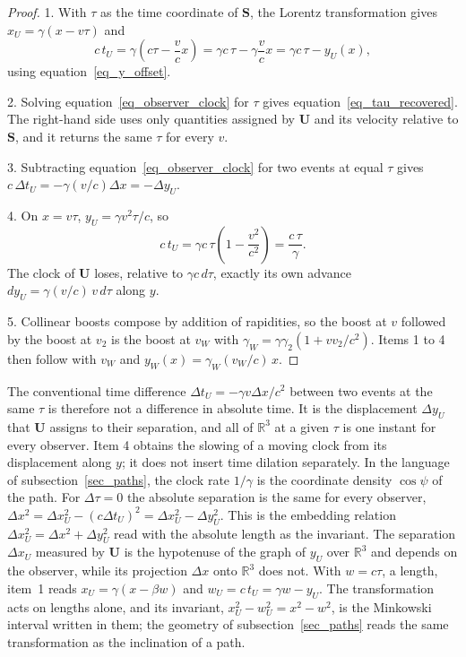 \documentclass[anonymous]{iopjournal}
\begin{document}
\begin{proof}
1. With $\tau$ as the time coordinate of $\mathbf{S}$, the Lorentz transformation gives $x_U=\gamma(x-v\tau)$ and
\begin{equation}
    c\,t_U=\gamma\left(c\tau-\frac{v}{c}x\right)=\gamma c\,\tau-\gamma\frac{v}{c}x=\gamma c\,\tau-y_U(x),
\end{equation}
using equation~\eqref{eq_y_offset}.

2. Solving equation~\eqref{eq_observer_clock} for $\tau$ gives equation~\eqref{eq_tau_recovered}. The right-hand side uses only quantities assigned by $\mathbf{U}$ and its velocity relative to $\mathbf{S}$, and it returns the same $\tau$ for every $v$.

3. Subtracting equation~\eqref{eq_observer_clock} for two events at equal $\tau$ gives $c\,\Delta t_U=-\gamma(v/c)\Delta x=-\Delta y_U$.

4. On $x=v\tau$, $y_U=\gamma v^2\tau/c$, so
\begin{equation}
    c\,t_U=\gamma c\,\tau\left(1-\frac{v^2}{c^2}\right)=\frac{c\,\tau}{\gamma}.
\end{equation}
The clock of $\mathbf{U}$ loses, relative to $\gamma c\,d\tau$, exactly its own advance $dy_U=\gamma(v/c)\,v\,d\tau$ along $y$.

5. Collinear boosts compose by addition of rapidities, so the boost at $v$ followed by the boost at $v_2$ is the boost at $v_W$ with $\gamma_W=\gamma\gamma_2(1+vv_2/c^2)$. Items 1 to 4 then follow with $v_W$ and $y_W(x)=\gamma_W(v_W/c)\,x$.
\end{proof}

The conventional time difference $\Delta t_U=-\gamma v\Delta x/c^2$ between two events at the same $\tau$ is therefore not a difference in absolute time. It is the displacement $\Delta y_U$ that $\mathbf{U}$ assigns to their separation, and all of $\mathbb{R}^3$ at a given $\tau$ is one instant for every observer. Item 4 obtains the slowing of a moving clock from its displacement along $y$; it does not insert time dilation separately. In the language of subsection~\ref{sec_paths}, the clock rate $1/\gamma$ is the coordinate density $\cos\psi$ of the path. For $\Delta\tau=0$ the absolute separation is the same for every observer, $\Delta x^2=\Delta x_U^2-(c\Delta t_U)^2=\Delta x_U^2-\Delta y_U^2$. This is the embedding relation $\Delta x_U^2=\Delta x^2+\Delta y_U^2$ read with the absolute length as the invariant. The separation $\Delta x_U$ measured by $\mathbf{U}$ is the hypotenuse of the graph of $y_U$ over $\mathbb{R}^3$ and depends on the observer, while its projection $\Delta x$ onto $\mathbb{R}^3$ does not. With $w=c\tau$, a length, item~1 reads $x_U=\gamma\left(x-\beta w\right)$ and $w_U=c\,t_U=\gamma w-y_U$. The transformation acts on lengths alone, and its invariant, $x_U^2-w_U^2=x^2-w^2$, is the Minkowski interval written in them; the geometry of subsection~\ref{sec_paths} reads the same transformation as the inclination of a path.
\end{document}
